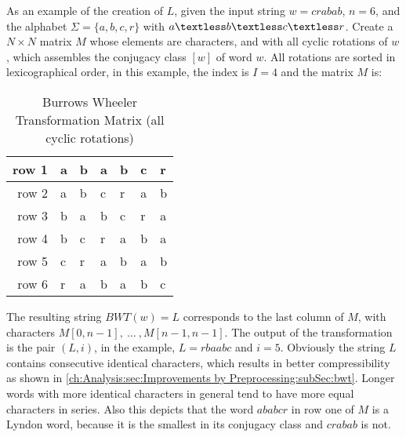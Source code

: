 \par {
As an example of the creation of $L$, given the input string $w = crabab$, $n = 6$, and the alphabet $\Sigma = \{a,b,c,r\}$ with $a \textless b \textless c \textless r $. Create a $N \times N$ matrix $M$ whose elements are characters, and with all cyclic rotations of $w$, which assembles the conjugacy class $[w]$ of word $w$. All rotations are sorted in lexicographical order, in this example, the index is $I = 4$ and the matrix $M$ is:

\begin{table}[h]
	\centering
	\begin{tabular}{r|l|l|l|l|l|l}
		row 1 & a & b & a & b & c & r\\
		\hline
		row 2 & a & b & c & r & a & b\\
		\hline
		row 3 & b & a & b & c & r & a\\
		\hline
		row 4 & b & c & r & a & b & a\\
		\hline
		row 5 & c & r & a & b & a & b\\
		\hline
		row 6 & r & a & b & a & b & c
		\label{tab:t10 bwt-example}
	\end{tabular}
	\caption{Burrows Wheeler Transformation Matrix (all cyclic rotations)}
\end{table}
The resulting string $BWT(w)=L$ corresponds to the last column of $M$, with characters $M[0,n -1],\: \dots \: ,M[n - 1, n - 1]$. The output of the transformation is the pair $(L, i)$, in the example, $L = rbaabc$ and $i = 5$. Obviously the string $L$ contains consecutive identical characters, which results in better compressibility as shown in \ref{ch:Analysis:sec:Improvements by Preprocessing:subSec:bwt}. Longer words with more identical characters in general tend to have more equal characters in series. Also this depicts that the word $ababcr$ in row one of $M$ is a Lyndon word, because it is the smallest in its conjugacy class and $crabab$ is not.
}

